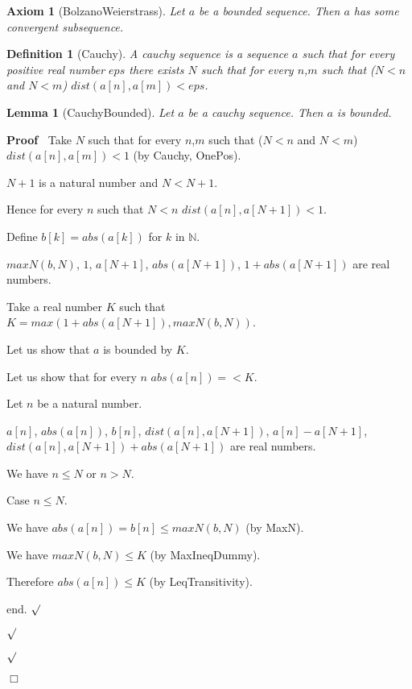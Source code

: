 \documentclass{article}
\newenvironment{forthel}{\begin{leftbar}}{\end{leftbar}}
\newenvironment{proof}{\noindent\textbf{Proof\ }}{\hspace*{\fill}$\Box$\medskip}
\newenvironment{subproof}{\begin{list}{}{}
		\item[\text{Proof}]}{\hfill $\surd$ \end{list}}
\newtheorem{axiom}{Axiom}
\newtheorem{lemma}{Lemma}
\newtheorem{definition}{Definition}
\newcommand{\NN}{\mathbb{N}}
\begin{document}
\begin{forthel}
	\begin{axiom}[BolzanoWeierstrass]
		Let $a$ be a bounded sequence. Then $a$ has some convergent subsequence. 
	\end{axiom}
	
	\begin{definition}[Cauchy]
		A cauchy sequence is a sequence $a$ such that for every positive real number $eps$ there exists $N$ such that
		for every $n$,$m$ such that ($N < n$ and $N < m$) $dist(a[n],a[m]) < eps$.
	\end{definition}
	
	\begin{lemma}[CauchyBounded]
		Let $a$ be a cauchy sequence. Then $a$ is bounded.
	\end{lemma}
	\begin{proof}
		Take $N$ such that for every $n$,$m$ such that ($N < n$ and $N < m$) $dist(a[n],a[m]) < 1$ (by Cauchy, OnePos).
		
		$N + 1$ is a natural number and $N < N + 1$.
		
		Hence for every $n$ such that $N < n$ $dist(a[n],a[N + 1]) < 1$.
		
		Define $b[k] = abs(a[k])$ for $k$ in $\NN$.
		
		$maxN(b,N)$, $1$, $a[N + 1]$, $abs(a[N + 1])$, $1 + abs(a[N + 1])$ are real numbers.
		
		Take a real number $K$ such that $K = max(1 + abs(a[N + 1]), maxN(b,N))$.
		
		Let us show that $a$ is bounded by $K$.
		
		\begin{subproof}
			Let us show that for every $n$ $abs(a[n]) =< K$. 
			
			\begin{subproof}
				Let $n$ be a natural number.
				
				$a[n]$, $abs(a[n])$, $b[n]$, $dist(a[n],a[N + 1])$, $a[n] - a[N + 1]$, $dist(a[n],a[N + 1]) + abs(a[N + 1])$ are real numbers.
				
				We have $n \leq N$ or $n > N$.
				
				Case $n \leq N$.
				
				\begin{subproof}
					We have $abs(a[n]) = b[n] \leq maxN(b,N)$ (by MaxN).
					
					We have $maxN(b,N) \leq K$ (by MaxIneqDummy).
					
					Therefore $abs(a[n]) \leq K$ (by LeqTransitivity).
					
					end.
				\end{subproof}	
				

\end{subproof}
\end{subproof}
\end{proof}
\end{forthel}
\end{document}
